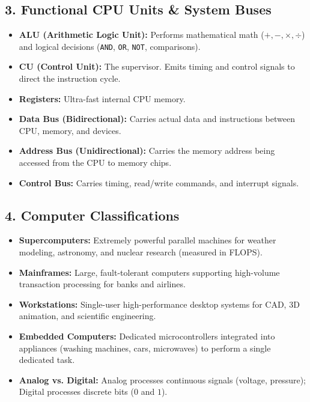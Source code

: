 \documentclass[a4paper,11pt]{article}
\begin{document}
\subsection{3. Functional CPU Units \& System Buses}
\begin{itemize}[leftmargin=5mm]
    \item \textbf{ALU (Arithmetic Logic Unit):} Performs mathematical math ($+, -, \times, \div$) and logical decisions (\texttt{AND}, \texttt{OR}, \texttt{NOT}, comparisons).
    \item \textbf{CU (Control Unit):} The supervisor. Emits timing and control signals to direct the instruction cycle.
    \item \textbf{Registers:} Ultra-fast internal CPU memory.
\end{itemize}

\begin{handwbox}
\begin{itemize}[leftmargin=5mm]
    \item \textbf{Data Bus (Bidirectional):} Carries actual data and instructions between CPU, memory, and devices.
    \item \textbf{Address Bus (Unidirectional):} Carries the memory address being accessed from the CPU to memory chips.
    \item \textbf{Control Bus:} Carries timing, read/write commands, and interrupt signals.
\end{itemize}
\end{handwbox}

\subsection{4. Computer Classifications}
\begin{itemize}[leftmargin=5mm]
    \item \textbf{Supercomputers:} Extremely powerful parallel machines for weather modeling, astronomy, and nuclear research (measured in FLOPS).
    \item \textbf{Mainframes:} Large, fault-tolerant computers supporting high-volume transaction processing for banks and airlines.
    \item \textbf{Workstations:} Single-user high-performance desktop systems for CAD, 3D animation, and scientific engineering.
    \item \textbf{Embedded Computers:} Dedicated microcontrollers integrated into appliances (washing machines, cars, microwaves) to perform a single dedicated task.
    \item \textbf{Analog vs. Digital:} Analog processes continuous signals (voltage, pressure); Digital processes discrete bits ($0$ and $1$).
\end{itemize}
\end{document}
